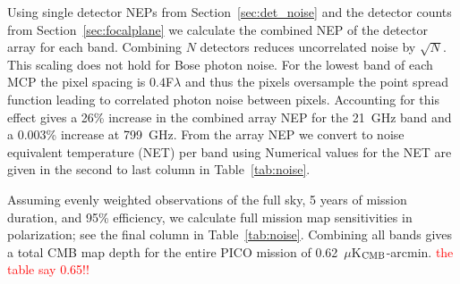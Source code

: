 \documentclass[]{spie}  %
\newcommand{\comr}[1]{\textcolor{red}{#1}}
\newcommand{\como}[1]{\textcolor{orange}{#1}}
\begin{document}
Using single detector NEPs from Section~\ref{sec:det_noise} and the detector counts from Section~\ref{sec:focalplane} we 
calculate the combined NEP of the detector array for each band.  Combining $N$ detectors reduces uncorrelated noise by $\sqrt{N}$. 
This scaling does not hold for Bose photon noise. 
For the lowest band of each MCP the pixel spacing is $0.4$F$\lambda$ and thus the pixels oversample the point spread function 
leading to correlated photon noise between pixels.
Accounting for this effect gives a 26\% increase in the combined array NEP for the 21~GHz band 
and a 0.003\% increase at 799~GHz. 
From the array NEP we convert to noise equivalent temperature (NET) per band using
Numerical values for the NET are given in the second to last column in Table~\ref{tab:noise}.

Assuming evenly weighted observations 
of the full sky, 5 years of mission duration, and 95\% efficiency, we calculate full mission map sensitivities in polarization; see the 
final column in Table~\ref{tab:noise}. 
Combining all bands gives a total CMB map depth for the entire PICO mission of 0.62~$\mu$K$_{\rm CMB}$-arcmin. \comr{the table 
say 0.65!!}
\end{document}
